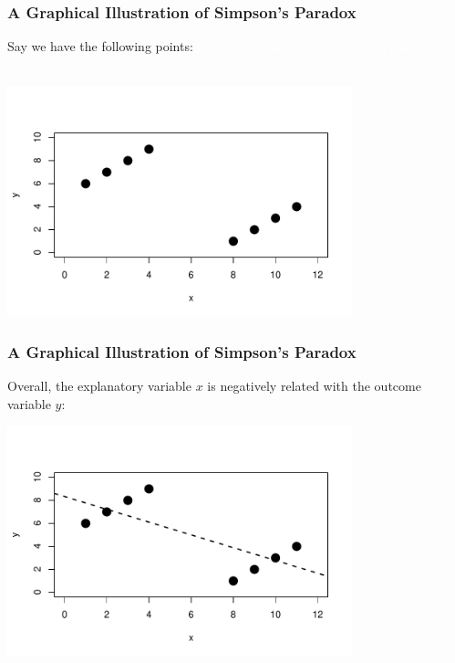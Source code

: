 \documentclass[handout]{beamer}
\newcommand{\blue}[1]{\textcolor{blue2}{#1}}
\begin{document}
\begin{frame}
\frametitle{A Graphical Illustration of Simpson's Paradox}
Say we have the following points: \textcolor{white}{lorem ipsum lorem ipsum lorem ipsum lorem ipsum}
\begin{center}
\includegraphics[width=10cm]{figure/simpsons1.pdf}
\end{center}

\end{frame}



\begin{frame}
\frametitle{A Graphical Illustration of Simpson's Paradox}
Overall, the explanatory variable $x$ is \blue{negatively} related with the outcome variable $y$:
\begin{center}
\includegraphics[width=10cm]{figure/simpsons2.pdf}
\end{center}

\end{frame}
\end{document}
